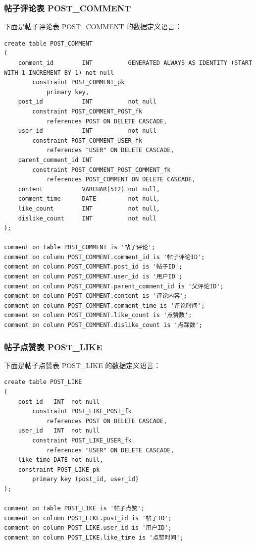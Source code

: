 \subsubsection{帖子评论表 POST\_COMMENT}

下面是帖子评论表 POST\_COMMENT 的数据定义语言：

\begin{verbatim}
create table POST_COMMENT
(
    comment_id        INT          GENERATED ALWAYS AS IDENTITY (START WITH 1 INCREMENT BY 1) not null
        constraint POST_COMMENT_pk
            primary key,
    post_id           INT          not null
        constraint POST_COMMENT_POST_fk
            references POST ON DELETE CASCADE,
    user_id           INT          not null
        constraint POST_COMMENT_USER_fk
            references "USER" ON DELETE CASCADE,
    parent_comment_id INT
        constraint POST_COMMENT_POST_COMMENT_fk
            references POST_COMMENT ON DELETE CASCADE,
    content           VARCHAR(512) not null,
    comment_time      DATE         not null,
    like_count        INT          not null,
    dislike_count     INT          not null
);

comment on table POST_COMMENT is '帖子评论';
comment on column POST_COMMENT.comment_id is '帖子评论ID';
comment on column POST_COMMENT.post_id is '帖子ID';
comment on column POST_COMMENT.user_id is '用户ID';
comment on column POST_COMMENT.parent_comment_id is '父评论ID';
comment on column POST_COMMENT.content is '评论内容';
comment on column POST_COMMENT.comment_time is '评论时间';
comment on column POST_COMMENT.like_count is '点赞数';
comment on column POST_COMMENT.dislike_count is '点踩数';
\end{verbatim}

\subsubsection{帖子点赞表 POST\_LIKE}

下面是帖子点赞表 POST\_LIKE 的数据定义语言：

\begin{verbatim}
create table POST_LIKE
(
    post_id   INT  not null
        constraint POST_LIKE_POST_fk
            references POST ON DELETE CASCADE,
    user_id   INT  not null
        constraint POST_LIKE_USER_fk
            references "USER" ON DELETE CASCADE,
    like_time DATE not null,
    constraint POST_LIKE_pk
        primary key (post_id, user_id)
);

comment on table POST_LIKE is '帖子点赞';
comment on column POST_LIKE.post_id is '帖子ID';
comment on column POST_LIKE.user_id is '用户ID';
comment on column POST_LIKE.like_time is '点赞时间';
\end{verbatim}

